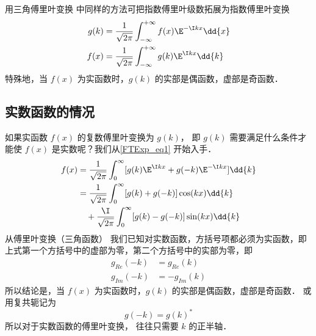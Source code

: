 
\begin{issues}
\issueAbstract
\end{issues}


用三角傅里叶变换  中同样的方法可把指数傅里叶级数拓展为指数傅里叶变换
\begin{align}\label{FTExp_eq6}
g(k) &= \frac{1}{\sqrt{2\pi }} \int_{-\infty }^{+\infty } f(x)\E^{-\I kx} \dd{x} \\
f(x) &= \frac{1}{\sqrt{2\pi }} \int_{-\infty }^{+\infty } g(k)\E^{\I kx} \dd{k} \label{FTExp_eq1}
\end{align}
特殊地，当 $f(x)$ 为实函数时，$g(k)$ 的实部是偶函数，虚部是奇函数．

\subsection{实数函数的情况}

如果实函数 $f(x)$ 的复数傅里叶变换为 $g(k)$， 即 $g(k)$ 需要满足什么条件才能使 $f(x)$ 是实数呢？我们从\autoref{FTExp_eq1} 开始入手．
\begin{equation}\begin{aligned}
f(x) &= \frac{1}{\sqrt{2\pi }} \int_0^\infty [g(k)\E^{\I kx} + g(-k)\E^{-\I kx}] \dd{k} \\
&= \frac{1}{\sqrt{2\pi }} \int_0^\infty [g(k)+g(-k)]\cos(kx)\dd{k}\\
&\quad + \frac{\I}{\sqrt{2\pi }} \int_0^\infty [g(k)-g(-k)]\sin(kx) \dd{k}
\end{aligned}\end{equation}
从傅里叶变换（三角函数）%
我们已知对实数函数，方括号项都必须为实函数，即上式第一个方括号中的虚部为零，第二个方括号中的实部为零，即
\begin{equation}\begin{aligned}
g_{Re}(-k) &= g_{Re}(k)\\
g_{Im}(-k) &= -g_{Im}(k)
\end{aligned}\end{equation}
所以结论是，当 $f(x)$ 为实函数时，$g(k)$ 的实部是偶函数，虚部是奇函数． 或用复共轭记为
\begin{equation}\label{FTExp_eq5}
g(-k) = g(k)^*
\end{equation}
所以对于实数函数的傅里叶变换， 往往只需要 $k$ 的正半轴．

